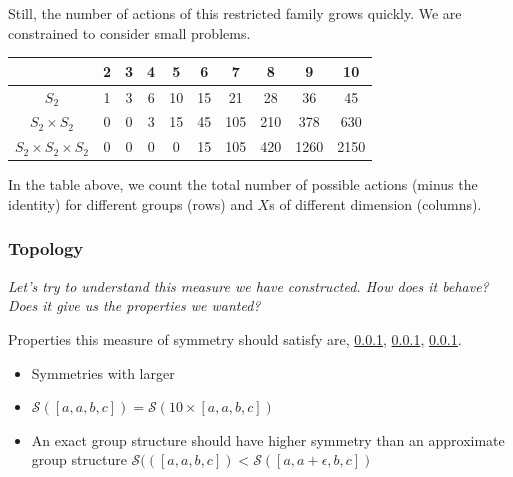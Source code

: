 Still, the number of actions of this restricted family grows quickly. We are constrained to consider small problems.

\begin{changemargin}{-3cm}{-3cm}
  \begin{center}
    \begin{tabular}{ c || c | c | c | c | c | c | c | c | c }
											        & 2 & 3 & 4 & 5  & 6   & 7   & 8   & 9 & 10 \\ \hline \hline
											  $S_2$ & 1 & 3 & 6 & 10 & 15  & 21  & 28  & 36   & 45\\ \hline
					   $S_2 \times S_2$ & 0 & 0 & 3 & 15 & 45  & 105 & 210 & 378  & 630 \\ \hline
	$S_2 \times S_2 \times S_2$ & 0 & 0 & 0 & 0  & 15  & 105 & 420 & 1260 & 2150 \\
    \end{tabular}
  \end{center}
\end{changemargin}

In the table above, we count the total number of possible actions (minus the identity) for
different groups (rows) and $X$s of different dimension (columns).


\subsubsection{Topology}

\begin{displayquote}
\textsl{Let's try to understand this measure we have constructed. How does it behave?
Does it give us the properties we wanted?}
\end{displayquote}

Properties this measure of symmetry should satisfy are, \ref{}, \ref{}, \ref{}.

\begin{itemize}
	\tightlist
	\item Symmetries with larger
	\item $\mathcal S([a,a,b,c]) = \mathcal S(10 \times [a,a,b,c])$
	\item An exact group structure should have higher symmetry than an approximate group structure $\mathcal S(([a,a,b,c]) < \mathcal S([a,a+\epsilon,b,c])$
\end{itemize}

